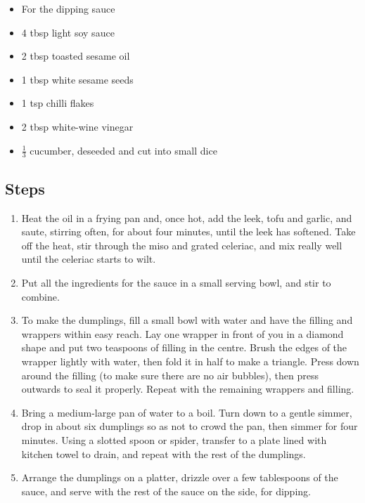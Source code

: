 \documentclass{book}
\begin{document}
\begin{itemize}
\item For the dipping sauce
\item 4 tbsp light soy sauce
\item 2 tbsp toasted sesame oil
\item 1 tbsp white sesame seeds
\item 1 tsp chilli flakes
\item 2 tbsp white-wine vinegar
\item $\frac{1}{3}$ cucumber, deseeded and cut into small dice
\end{itemize}

\subsection*{Steps}
\begin{enumerate}
\item Heat the oil in a frying pan and, once hot, add the leek, tofu and garlic, and saute, stirring often, for about four minutes, until the leek has softened. Take off the heat, stir through the miso and grated celeriac, and mix really well until the celeriac starts to wilt.
\item Put all the ingredients for the sauce in a small serving bowl, and stir to combine.
\item To make the dumplings, fill a small bowl with water and have the filling and wrappers within easy reach. Lay one wrapper in front of you in a diamond shape and put two teaspoons of filling in the centre. Brush the edges of the wrapper lightly with water, then fold it in half to make a triangle. Press down around the filling (to make sure there are no air bubbles), then press outwards to seal it properly. Repeat with the remaining wrappers and filling.
\item Bring a medium-large pan of water to a boil. Turn down to a gentle simmer, drop in about six dumplings so as not to crowd the pan, then simmer for four minutes. Using a slotted spoon or spider, transfer to a plate lined with kitchen towel to drain, and repeat with the rest of the dumplings.
\item Arrange the dumplings on a platter, drizzle over a few tablespoons of the sauce, and serve with the rest of the sauce on the side, for dipping.
\end{enumerate}
\newpage
\end{document}
